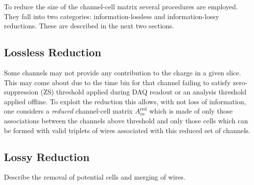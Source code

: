 \documentclass[letter]{article}
\begin{document}
To reduce the size of the channel-cell matrix several procedures are
employed.
They fall into two categories: information-lossless and
information-lossy reductions.
These are described in the next two sections.



\subsection{Lossless Reduction}

Some channels may not provide any contribution to the charge in a
given slice.
This may come about due to the time bin for that channel failing to
satisfy zero-suppression (ZS) threshold applied during DAQ readout or
an analysis threshold applied offline.
To exploit the reduction this allows, with not loss of information,
one considers a \textit{reduced} channel-cell matrix
$A^\mathrm{red}_{i\alpha}$ which is made of only those associations
between the channels above threshold and only those cells which can be
formed with valid triplets of wires associated with this reduced set of
channels.

\subsection{Lossy Reduction}

Describe the removal of potential cells and merging of wires.
\end{document}
